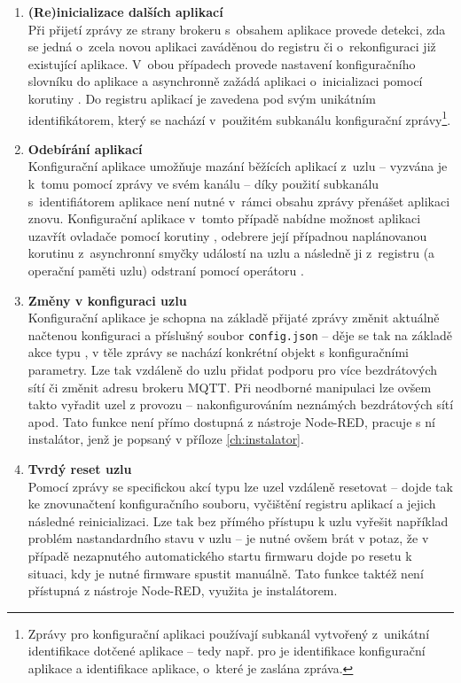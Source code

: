 \begin{enumerate}
    \item \textbf{(Re)inicializace dalších aplikací} \\
    Při přijetí zprávy ze strany brokeru s~obsahem 
    aplikace provede detekci, zda se jedná o~zcela novou aplikaci zaváděnou do registru či
    o~rekonfiguraci již existující aplikace. V~obou případech provede nastavení konfiguračního
    slovníku do aplikace a asynchronně zažádá aplikaci o~inicializaci pomocí korutiny .
    Do registru aplikací je zavedena pod svým unikátním identifikátorem, který se nachází v~použitém
    subkanálu konfigurační zprávy\footnote{Zprávy pro konfigurační aplikaci používají subkanál vytvořený
    z~unikátní identifikace dotčené aplikace -- tedy např. pro 
    je  identifikace konfigurační aplikace a  identifikace aplikace,
    o~které je zaslána zpráva.}.
    \item \textbf{Odebírání aplikací} \\
    Konfigurační aplikace umožňuje mazání běžících aplikací z~uzlu -- vyzvána je k~tomu pomocí zprávy
     ve svém kanálu -- díky použití subkanálu s~identifiátorem aplikace
    není nutné v~rámci obsahu zprávy přenášet aplikaci znovu. Konfigurační aplikace v~tomto případě
    nabídne možnost aplikaci uzavřít ovladače pomocí korutiny , odebrere její případnou
    naplánovanou korutinu z~asynchronní smyčky událostí na uzlu a následně ji z~registru (a operační paměti uzlu)
    odstraní pomocí operátoru .
    \item \textbf{Změny v konfiguraci uzlu} \\
    Konfigurační aplikace je schopna na základě přijaté zprávy změnit aktuálně načtenou konfiguraci a příslušný
    soubor \texttt{config.json} -- děje se tak na základě akce typu , v těle zprávy se nachází
    konkrétní objekt s konfiguračními parametry. Lze tak vzdáleně do uzlu přidat podporu pro více bezdrátových sítí či
    změnit adresu brokeru MQTT. Při neodborné manipulaci lze ovšem takto vyřadit uzel z provozu -- nakonfigurováním
    neznámých bezdrátových sítí apod. Tato funkce není přímo dostupná z nástroje Node-RED, pracuje s ní instalátor,
    jenž je popsaný v příloze \ref{ch:instalator}.

    \item \textbf{Tvrdý reset uzlu} \\
    Pomocí zprávy se specifickou akcí typu  lze uzel vzdáleně resetovat -- dojde tak ke
    znovunačtení konfiguračního souboru, vyčištění registru aplikací a jejich následné reinicializaci.
    Lze tak bez přímého přístupu k uzlu vyřešit například problém nastandardního stavu v uzlu -- je nutné ovšem brát
    v potaz, že v případě nezapnutého automatického startu firmwaru dojde po resetu k situaci, kdy je nutné firmware
    spustit manuálně. Tato funkce taktéž není přístupná z nástroje Node-RED, využita je instalátorem.
\end{enumerate}
